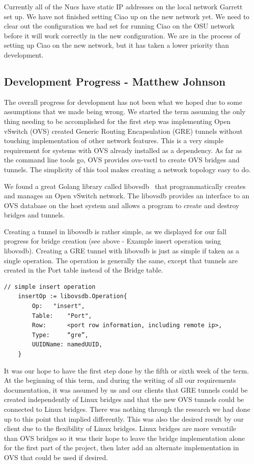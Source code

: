 \documentclass[10pt,onecolumn,journal,draftclsnofoot]{IEEEtran}
\begin{document}
Currently all of the Nucs have static IP addresses on the local network Garrett
set up. We have not finished setting Ciao up on the new network yet. We need to
clear out the configuration we had set for running Ciao on the OSU network
before it will work correctly in the new configuration. We are in the process of
setting up Ciao on the new network, but it has taken a lower priority than
development.

\subsection{Development Progress - Matthew Johnson}

The overall progress for development has not been what we hoped due to some
assumptions that we made being wrong. We started the term assuming the only
thing needing to be accomplished for the first step was implementing Open
vSwitch (OVS) created Generic Routing Encapsulation (GRE) tunnels without
touching implementation of other network features. This is a very simple
requirement for systems with OVS already installed as a dependency. As far as
the command line tools go, OVS provides ovs-vsctl to create OVS bridges and
tunnels. The simplicity of this tool makes creating a network topology easy to
do.

We found a great Golang library called libovsdb~\cite{libovsdb} that
programmatically creates and manages an Open vSwitch network. The libovsdb
provides an interface to an OVS database on the host system and allows a
program to create and destroy bridges and tunnels.

Creating a tunnel in libovsdb is rather simple, as we displayed for our fall
progress for bridge creation (see above - Example insert operation using
libovsdb). Creating a GRE tunnel with libovsdb is just as simple if taken as a
single operation. The operation is generally the same, except that tunnels are
created in the Port table instead of the Bridge table.

\begin{lstlisting}[caption=Example tunnel insert operation using libovsdb]
	// simple insert operation
	insertOp := libovsdb.Operation{
		Op:	  "insert",
		Table:	  "Port",
		Row:	  <port row information, including remote ip>,
		Type:     “gre”,
		UUIDName: namedUUID,
	}
\end{lstlisting}

It was our hope to have the first step done by the fifth or sixth week of the
term. At the beginning of this term, and during the writing of all our
requirements documentation, it was assumed by us and our clients that GRE
tunnels could be created independently of Linux bridges and that the new OVS
tunnels could be connected to Linux bridges. There was nothing through the
research we had done up to this point that implied differently. This was also
the desired result by our client due to the flexibility of Linux bridges. Linux
bridges are more versatile than OVS bridges so it was their hope to leave the
bridge implementation alone for the first part of the project, then later add
an alternate implementation in OVS that could be used if desired.
\end{document}
